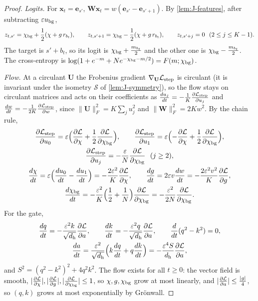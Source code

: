 \begin{proof}
\emph{Logits.} For $\bm x_t=\bm e_{s'}$, $\mathbf W\bm x_t=w(\bm e_{s'}-\bm e_{s'+1})$. By \cref{lem:J-features}, after subtracting $\varepsilon u_{\mathrm{bg}}$,
\[
 z_{t,s'}=\cbg+\tfrac{1}{2}(\cnt+g\,r_{b_t}),\qquad z_{t,s'+1}=\cbg-\tfrac{1}{2}(\cnt+g\,r_{b_t}),\qquad z_{t,s'+j}=0\ \ (2\le j\le K-1).
\]
The target is $s'+b_t$, so its logit is $\chi_{\mathrm{bg}}+\frac{m_{b_t}}{2}$ and the other one is $\chi_{\mathrm{bg}}-\frac{m_{b_t}}{2}$. The cross-entropy is
$\log(1+e^{-m}+Ne^{-\chi_{\mathrm{bg}}-m/2})=F(m;\chi_{\mathrm{bg}})$.

\emph{Flow.} At a circulant $\mathbf U$ the Frobenius gradient $\nabla_{\mathbf U}\mathcal L_{\mathrm{step}}$ is circulant (it is invariant under the isometry $\mathcal S$ of
\cref{lem:J-symmetry}), so the flow stays on circulant matrices and acts on their coefficients as $\ddt{u_j}=-\frac{1}{K}\pd{\Lstep}{u_j}$ and $\ddt{w}=-\frac{1}{2K}\pd{\Lstep}{w}$, since
$\|\mathbf U\|_F^2=K\sum_ju_j^2$ and $\|\mathbf W\|_F^2=2Kw^2$. By the chain rule,
\begin{gather*}
 \pd{\Lstep}{u_0}=\initscale\Bigl(\pd{\mathcal L}{\cnt}+\tfrac{1}{2}\pd{\mathcal L}{\cbg}\Bigr),\qquad \pd{\Lstep}{u_1}=\initscale\Bigl(-\pd{\mathcal L}{\cnt}+\tfrac{1}{2}\pd{\mathcal L}{\cbg}\Bigr),\\
 \pd{\Lstep}{u_j}=-\frac{\initscale}{N}\pd{\mathcal L}{\cbg}\ \ (j\ge2),\\
 \ddt{\cnt}=\initscale\Bigl(\ddt{u_0}-\ddt{u_1}\Bigr)=-\frac{2\initscale^2}{K}\pd{\mathcal L}{\cnt},\qquad
 \ddt{g}=2\initscale v\ddt{w}=-\frac{2\initscale^2v^2}{K}\pd{\mathcal L}{g},\\
 \ddt{\cbg}=-\frac{\initscale^2}{K}\Bigl(\frac{1}{2}+\frac{1}{N}\Bigr)\pd{\mathcal L}{\cbg}=-\frac{\initscale^2}{2N}\pd{\mathcal L}{\cbg}.
\end{gather*}
For the gate,
\begin{gather*}
 \ddt{q}=-\frac{\initscale^2k}{\sqrt{d_{\mathrm h}}}\pd{\mathcal L}{a},\qquad \ddt{k}=-\frac{\initscale^2q}{\sqrt{d_{\mathrm h}}}\pd{\mathcal L}{a},\qquad \frac{d}{dt}(q^2-k^2)=0,\\
 \ddt{a}=\frac{\initscale^2}{\sqrt{d_{\mathrm h}}}\Bigl(k\ddt{q}+q\ddt{k}\Bigr)=-\frac{\initscale^4S}{d_{\mathrm h}}\pd{\mathcal L}{a},
\end{gather*}
and $S^2=(q^2-k^2)^2+4q^2k^2$. The flow exists for all $t\ge0$: the vector field is smooth, $|\pd{\mathcal L}{\cnt}|,|\pd{\mathcal L}{g}|,|\pd{\mathcal L}{\cbg}|\le1$, so
$\chi,g,\chi_{\mathrm{bg}}$ grow at most linearly, and $|\pd{\mathcal L}{a}|\le\frac{|g|}{4}$, so $(q,k)$ grows at most exponentially by Gr\"onwall.
\end{proof}

